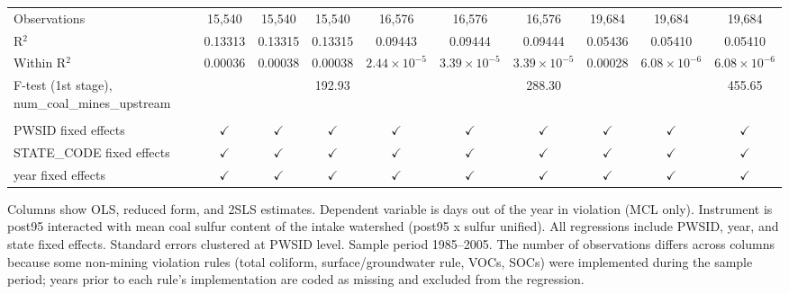 \begin{table}[htbp]
\begin{adjustbox}{width = \textwidth, center}
\begin{tabular}{lccccccccc}
         Observations                                      & 15,540        & 15,540        & 15,540        & 16,576                & 16,576                & 16,576                & 19,684        & 19,684                & 19,684\\  
         R$^2$                                             & 0.13313       & 0.13315       & 0.13315       & 0.09443               & 0.09444               & 0.09444               & 0.05436       & 0.05410               & 0.05410\\  
         Within R$^2$                                      & 0.00036       & 0.00038       & 0.00038       & $2.44\times 10^{-5}$  & $3.39\times 10^{-5}$  & $3.39\times 10^{-5}$  & 0.00028       & $6.08\times 10^{-6}$  & $6.08\times 10^{-6}$\\   
         F-test (1st stage), num\_coal\_mines\_upstream    &               &               & 192.93        &                       &                       & 288.30                &               &                       & 455.65\\  
         
          \\
         
         PWSID fixed effects                               & $\checkmark$  & $\checkmark$  & $\checkmark$  & $\checkmark$          & $\checkmark$          & $\checkmark$          & $\checkmark$  & $\checkmark$          & $\checkmark$\\   
         STATE\_CODE fixed effects                         & $\checkmark$  & $\checkmark$  & $\checkmark$  & $\checkmark$          & $\checkmark$          & $\checkmark$          & $\checkmark$  & $\checkmark$          & $\checkmark$\\   
         year fixed effects                                & $\checkmark$  & $\checkmark$  & $\checkmark$  & $\checkmark$          & $\checkmark$          & $\checkmark$          & $\checkmark$  & $\checkmark$          & $\checkmark$\\   
         
         \bottomrule
         
      \end{tabular}
      
      
      
   \end{adjustbox}
      {\tiny\linespread{1}\selectfont \par \raggedright 
   Columns show OLS, reduced form, and 2SLS estimates. Dependent variable is days out of the year in violation (MCL only). Instrument is post95 interacted with mean coal sulfur content of the intake watershed (post95 x sulfur unified). All regressions include PWSID, year, and state fixed effects. Standard errors clustered at PWSID level. Sample period 1985--2005. The number of observations differs across columns because some non-mining violation rules (total coliform, surface/groundwater rule, VOCs, SOCs) were implemented during the sample period; years prior to each rule's implementation are coded as missing and excluded from the regression.}
   
\end{table}


